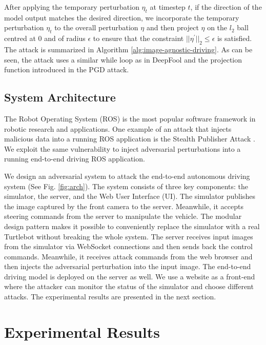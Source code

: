 After applying the temporary perturbation $\eta_{t}$ at timestep $t$, if the direction of the model output matches the desired direction, we incorporate the temporary perturbation $\eta_{t}$ to the overall perturbation $\eta$ and then project $\eta$ on the $l_2$ ball centred at 0 and of radius $\epsilon$ to ensure that the constraint $||{\eta}^{'}||_{2} \leq \epsilon$ is satisfied. The attack is summarized in Algorithm \ref{alg:image-agnostic-driving}. As can be seen, the attack uses a similar while loop as in DeepFool and the projection function introduced in the PGD attack.


\subsection{System Architecture}

The Robot Operating System (ROS) \citep{ros} is the most popular software framework in robotic research and applications. One example of an attack that
injects malicious data into a running ROS application is the Stealth Publisher Attack \citep{dieber2020penetration}. We exploit the same vulnerability to inject adversarial perturbations into a running end-to-end driving ROS application.

We design an adversarial system to attack the end-to-end autonomous driving system (See Fig. \ref{fig:arch}). The system consists of three key components: the simulator, the server, and the Web User Interface (UI). The simulator publishes the image captured by the front camera to the server. Meanwhile, it accepts steering commands from the server to manipulate the vehicle. The modular design pattern makes it possible to conveniently replace the simulator with a real Turtlebot without breaking the whole system. The server receives input images from the simulator via WebSocket connections and then sends back the control commands. Meanwhile, it receives attack commands from the web browser and then injects the adversarial perturbation into the input image. The end-to-end driving model is deployed on the server as well. We use a website as a front-end where the attacker can monitor the status of the simulator and choose different attacks.
The experimental results are presented in the next section.


\section{Experimental Results}

